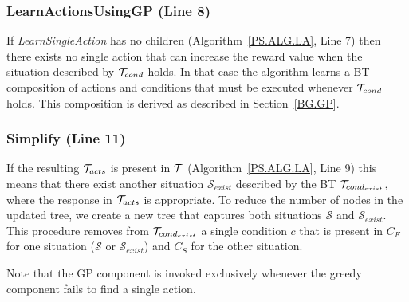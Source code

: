 \subsubsection{LearnActionsUsingGP (Line 8)}
If \emph{LearnSingleAction} has no children (Algorithm~\ref{PS.ALG.LA}, Line 7) then there exists no single action that can increase the reward value when
the situation described by $\mathcal{T}_{cond}$ holds. In that case the algorithm learns a BT composition of actions and conditions that must be executed whenever $\mathcal{T}_{cond}$ holds. This composition is derived as described in Section~\ref{BG.GP}.
\subsubsection{Simplify (Line 11)}
If the resulting $\mathcal{T}_{acts}$ is present in $\mathcal{T}$ (Algorithm~\ref{PS.ALG.LA}, Line 9) this means that there exist another situation $\mathcal{S}_{exist}$ described by the BT $\mathcal{T}_{cond_{exist}}$, where the response in $\mathcal{T}_{acts}$ is appropriate. To reduce the number of nodes in the updated tree, we create a new tree that captures both situations $\mathcal{S}$ and $\mathcal{S}_{exist}$. This procedure  removes from $\mathcal{T}_{cond_{exist}}$ a single condition $c$ that is present in $C_F$  for one situation ($\mathcal{S}$ or $\mathcal{S}_{exist}$) and $C_S$ for the other situation. 

\begin{remark}
Note that the GP component is invoked exclusively whenever the greedy component fails to find a single action.
\end{remark}

